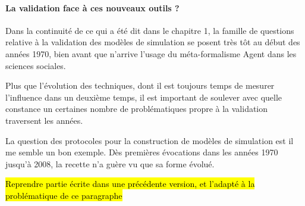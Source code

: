 

\paragraph{La validation face à ces nouveaux outils ?}

Dans la continuité de ce qui a été dit dans le chapitre 1, la famille de questions relative à la validation des modèles de simulation se posent très tôt au début des années 1970, bien avant que n'arrive l'usage du méta-formalisme Agent dans les sciences sociales.

Plus que l'évolution des techniques, dont il est toujours temps de mesurer l'influence dans un deuxième temps, il est important de soulever avec quelle constance un certaines nombre de problématiques propre à la validation traversent les années. 

La question des protocoles pour la construction de modèles de simulation est il me semble un bon exemple. Dès premières évocations dans les années 1970 jusqu'à 2008, la recette n'a guère vu que sa forme évolué.

\hl{Reprendre partie écrite dans une précédente version, et l'adapté à la problématique de ce paragraphe}


